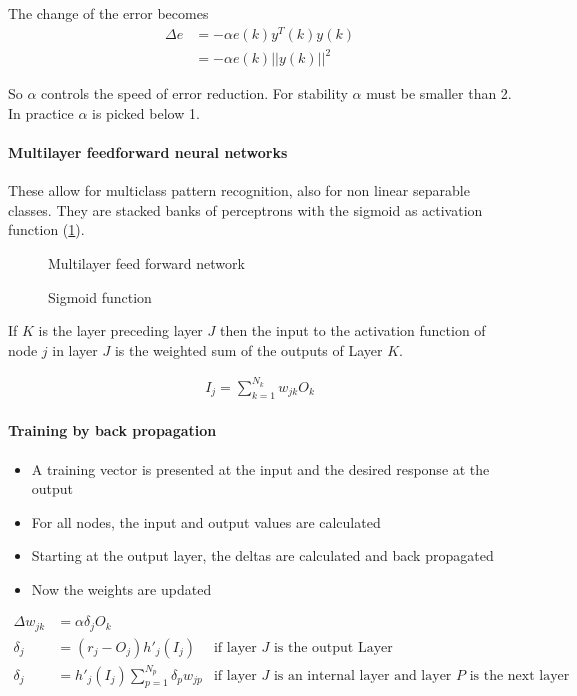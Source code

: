 The change of the error becomes
\begin{align*}
\Delta e &= -\alpha e(k) y^T(k) y(k) \\
 &= - \alpha e(k) ||y(k)||^2
\end{align*}

So $\alpha$ controls the speed of error reduction.
For stability $\alpha$ must be smaller than 2.
In practice $\alpha$ is picked below 1.

\paragraph{Multilayer feedforward neural networks}
These allow for multiclass pattern recognition, also for non linear separable classes.
They are stacked banks of perceptrons with the sigmoid as activation function (\ref{fig:sigmoid}).

\begin{figure}[htp]
\centering

\caption{Multilayer feed forward network}
\end{figure}

\begin{figure}[htp]
\centering

\caption{Sigmoid function}
\label{fig:sigmoid}
\end{figure}

If $K$ is the layer preceding layer $J$ then the input to the activation function of node $j$ in layer $J$ is the weighted sum of the outputs of Layer $K$.

\begin{align*}
I_j = \sum_{k=1}^{N_k}w_{jk}O_k
\end{align*}

\paragraph{Training by back propagation}
\begin{itemize}
\item A training vector is presented at
the input and the desired response
at the output
\item For all nodes, the input and output values are calculated
\item Starting at the output layer, the
deltas are calculated and back
propagated
\item Now the weights are updated
\end{itemize}

\begin{align*}
\Delta w_{jk} &= \alpha \delta_j O_k& \\
\delta_j &= (r_j-O_j) h'_j(I_j) & \text{if layer $J$ is the output Layer} \\
\delta_j &= h'_j(I_j) \sum_{p=1}^{N_p}\delta_p w_{jp} & \text{if layer $J$ is an internal layer and layer $P$ is the next layer}
\end{align*}

